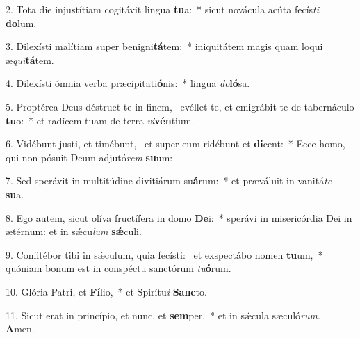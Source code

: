2. Tota die injustítiam cogitávit lingua \textbf{tu}a:~*  sicut novácula acúta fecís\textit{ti} \textbf{do}lum.\

3. Dilexísti malítiam super benigni\textbf{tá}tem:~*  iniquitátem magis quam loqui æ\textit{qui}\textbf{tá}tem.\

4. Dilexísti ómnia verba præcipitati\textbf{ó}nis:~*  lingua \textit{do}\textbf{ló}sa.\

5. Proptérea Deus déstruet te in finem, \dag\  evéllet te, et emigrábit te de tabernáculo \textbf{tu}o:~*  et radícem tuam de terra \textit{vi}\textbf{vén}tium.\

6. Vidébunt justi, et timébunt, \dag\  et super eum ridébunt et \textbf{di}cent:~*  Ecce homo, qui non pósuit Deum adjutó\textit{rem} \textbf{su}um:\

7. Sed sperávit in multitúdine divitiárum su\textbf{á}rum:~*  et præváluit in vanitá\textit{te} \textbf{su}a.\

8. Ego autem, sicut olíva fructífera in domo \textbf{De}i:~*  sperávi in misericórdia Dei in ætérnum: et in sǽcu\textit{lum} \textbf{sǽ}culi.\

9. Confitébor tibi in sǽculum, quia fecísti: \dag\  et exspectábo nomen \textbf{tu}um,~*  quóniam bonum est in conspéctu sanctórum \textit{tu}\textbf{ó}rum.\

10. Glória Patri, et \textbf{Fí}lio,~*  et Spirítu\textit{i} \textbf{Sanc}to.\

11. Sicut erat in princípio, et nunc, et \textbf{sem}per,~*  et in sǽcula sæculó\textit{rum}. \textbf{A}men.\


